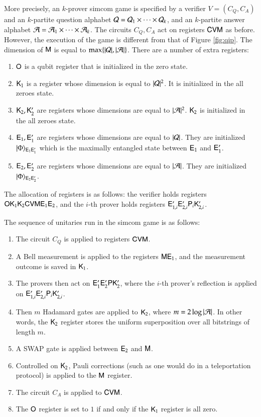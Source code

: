 More precisely, an $k$-prover simcom game is specified by a verifier $V = (C_Q,C_A)$ and an $k$-partite question alphabet $\mathcal Q = \mathcal Q_1 \times \cdots \times \mathcal Q_k$, and an $k$-partite answer alphabet $\mathcal A = \mathcal A_1 \times \cdots \times \mathcal A_k$. The circuits $C_Q, C_A$ act on registers ${\mathsf{C}} {\mathsf{V}} {\mathsf{M}}$ as before. However, the execution of the game is different from that of Figure \ref{fig:qip}. The dimension of ${\mathsf{M}}$ is equal to $\max\{ |\mathcal Q|, |\mathcal A| \}$. There are a number of extra registers:
\begin{enumerate}
	\item ${\mathsf{O}}$ is a qubit register that is initialized in the zero state.
	\item ${\mathsf{K}}_1$ is a register whose dimension is equal to $|\mathcal Q|^2$. It is initialized in the all zeroes state.
	\item ${\mathsf{K}}_2,{\mathsf{K}}_2'$ are registers whose dimensions are equal to $|\mathcal A|^2$. ${\mathsf{K}}_2$ is initialized in the all zeroes state.
	\item ${\mathsf{E}}_1,{\mathsf{E}}_1'$ are registers whose dimensions are equal to $|\mathcal Q|$. They are initialized $|\Phi\rangle_{{\mathsf{E}}_{1} {\mathsf{E}}_{1}'}$ which is the maximally entangled state between ${\mathsf{E}}_1$ and ${\mathsf{E}}_1'$.
	\item ${\mathsf{E}}_2,{\mathsf{E}}_2'$ are registers whose dimensions are equal to $|\mathcal A|$. They are initialized $|\Phi\rangle_{{\mathsf{E}}_{2} {\mathsf{E}}_{2}'}$.	
\end{enumerate}
The allocation of registers is as follows: the verifier holds registers ${\mathsf{O}} {\mathsf{K}}_1 {\mathsf{K}}_2 {\mathsf{C}} {\mathsf{V}} {\mathsf{M}} {\mathsf{E}}_1 {\mathsf{E}}_2$, and the $i$-th prover holds registers ${\mathsf{E}}_{1,i}' {\mathsf{E}}_{2,i}' {\mathsf{P}}_i {\mathsf{K}}_{2,i}'$. 

\medskip
\noindent The sequence of unitaries run in the simcom game is as follows:
\begin{enumerate}
	\item The circuit $C_Q$ is applied to registers ${\mathsf{C}} {\mathsf{V}} {\mathsf{M}}$.
	\item A Bell measurement is applied to the registers ${\mathsf{M}} {\mathsf{E}}_1$, and the measurement outcome is saved in ${\mathsf{K}}_1$.
	\item The provers then act on ${\mathsf{E}}_1' {\mathsf{E}}_2' {\mathsf{P}} {\mathsf{K}}_2'$, where the $i$-th prover's reflection is applied on ${\mathsf{E}}_{1,i}' {\mathsf{E}}_{2,i}' {\mathsf{P}}_i {\mathsf{K}}_{2,i}'$.
	\item Then $m$ Hadamard gates are applied to ${\mathsf{K}}_2$, where $m = 2\log |\mathcal A|$. In other words, the ${\mathsf{K}}_2$ register stores the uniform superposition over all bitstrings of length $m$.
	\item A SWAP gate is applied between ${\mathsf{E}}_2$ and ${\mathsf{M}}$.
	\item Controlled on ${\mathsf{K}}_2$, Pauli corrections (such as one would do in a teleportation protocol) is applied to the ${\mathsf{M}}$ register.
	\item The circuit $C_A$ is applied to ${\mathsf{C}} {\mathsf{V}} {\mathsf{M}}$.
	\item The ${\mathsf{O}}$ register is set to $1$ if and only if the ${\mathsf{K}}_1$ register is all zero. 
\end{enumerate}

